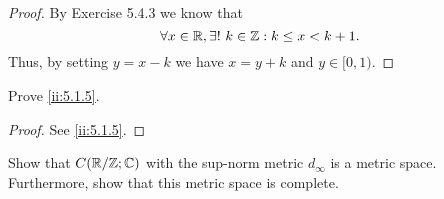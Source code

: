 \begin{proof}
  By Exercise 5.4.3 we know that
  \[
    \forall x \in \mathbb{R}, \exists!\ k \in \mathbb{Z} : k \leq x < k + 1.
  \]
  Thus, by setting \(y = x - k\) we have \(x = y + k\) and \(y \in [0, 1)\).
\end{proof}

\begin{ex}\label{ii:ex:5.1.2}
  Prove \cref{ii:5.1.5}.
\end{ex}

\begin{proof}
  See \cref{ii:5.1.5}.
\end{proof}

\begin{ex}\label{ii:ex:5.1.3}
  Show that \(C(\mathbb{R} / \mathbb{Z} ; \mathbb{C})\) with the sup-norm metric \(d_\infty\) is a metric space.
  Furthermore, show that this metric space is complete.
\end{ex}

